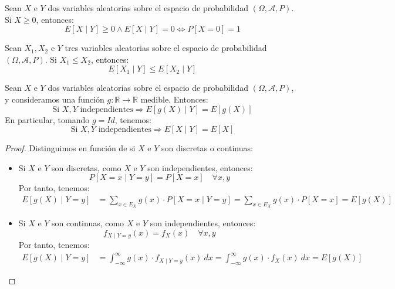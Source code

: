 \begin{prop}
    Sean $X$ e $Y$ dos variables aleatorias sobre el espacio de probabilidad $(\Omega, \mathcal{A}, P)$. Si $X\geq 0$, entonces:
    \begin{equation*}
        E[X\mid Y] \geq 0 \land E[X\mid Y] =0\Longleftrightarrow P[X=0] = 1
    \end{equation*}
\end{prop}

\begin{prop}
    Sean $X_1,X_2$ e $Y$ tres variables aleatorias sobre el espacio de probabilidad $(\Omega, \mathcal{A}, P)$. Si $X_1\leq X_2$, entonces:
    \begin{equation*}
        E[X_1\mid Y] \leq E[X_2\mid Y]
    \end{equation*}
\end{prop}

\begin{prop}
    Sean $X$ e $Y$ dos variables aleatorias sobre el espacio de probabilidad $(\Omega, \mathcal{A}, P)$, y consideramos una función $g:\mathbb{R}\to\mathbb{R}$ medible. Entonces:
    \begin{equation*}
        \text{Si } X,Y \text{ independientes} \Longrightarrow E[g(X)\mid Y] = E[g(X)]
    \end{equation*}
    En particular, tomando $g=Id$, tenemos:
    \begin{equation*}
        \text{Si } X,Y \text{ independientes} \Longrightarrow E[X\mid Y] = E[X]
    \end{equation*}
\end{prop}
\begin{proof}
    Distinguimos en función de si $X$ e $Y$ son discretas o continuas:
    \begin{itemize}
        \item Si $X$ e $Y$ son discretas, como $X$ e $Y$ son independientes, entonces:
        \begin{equation*}
            P[X = x\mid Y = y] = P[X = x] \quad \forall x,y
        \end{equation*}
        Por tanto, tenemos:
        \begin{align*}
            E[g(X)\mid Y = y] &= \sum_{x\in E_X} g(x)\cdot P[X = x\mid Y = y] = \sum_{x\in E_X} g(x)\cdot P[X = x] = E[g(X)]
        \end{align*}

        \item Si $X$ e $Y$ son continuas, como $X$ e $Y$ son independientes, entonces:
        \begin{equation*}
            f_{X\mid Y=y}(x) = f_X(x) \quad \forall x,y
        \end{equation*}
        Por tanto, tenemos:
        \begin{align*}
            E[g(X)\mid Y = y] &= \int_{-\infty}^{\infty} g(x)\cdot f_{X\mid Y=y}(x)~dx = \int_{-\infty}^{\infty} g(x)\cdot f_X(x)~dx = E[g(X)]
        \end{align*}
    \end{itemize}
\end{proof}

